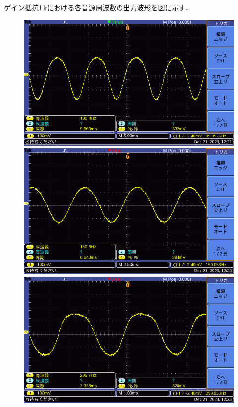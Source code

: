 \documentclass{ltjsarticle}
\begin{document}
\clearpage
			ゲイン抵抗1\,k\Omega における各音源周波数の出力波形を図に示す．
			\begin{figure}[H]
			\centering
			\begin{minipage}{0.4\columnwidth}
			\centering
			\includegraphics[width = \columnwidth]{figs/F0016TEK.PNG}
			\end{minipage}
			\hspace{0.04\columnwidth}
			\begin{minipage}{0.4\columnwidth}
			\centering
			\includegraphics[width = \columnwidth]{figs/F0017TEK.PNG}
			\end{minipage}
			\hspace{0.04\columnwidth}
			\begin{minipage}{0.4\columnwidth}
			\centering
			\includegraphics[width = \columnwidth]{figs/F0018TEK.PNG}

\end{minipage}
\end{figure}
\end{document}
